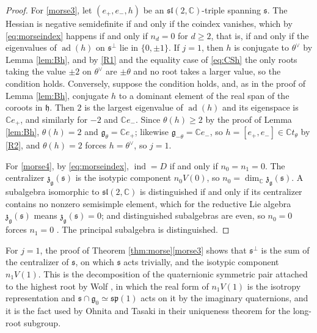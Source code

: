 \documentclass[leqno,10pt]{amsart}
\theoremstyle{definition}
\numberwithin{equation}{section}
\newcommand{\h}{\mathfrak{h}}
\newcommand{\sll}{\mathfrak{sl}}
\newcommand{\g}{\mathfrak{g}}
\newcommand{\ad}{\operatorname{ad}}
\newcommand{\com}{\mathbb C}
\newcommand{\gz}{\g_{0}}
\newcommand{\subs}{\mathfrak{s}}
\begin{document}
\begin{proof}
For \ref{morse3}, let $(e_{+}, e_{-}, h)$ be an $\sll(2, \com)$-triple spanning $\subs$. The Hessian is negative semidefinite if and only if the coindex vanishes, which by \eqref{eq:morseindex} happens if and only if $n_{d} = 0$ for $d \geq 2$, that is, if and only if the eigenvalues of $\ad(h)$ on $\subs^{\perp}$ lie in $\{0, \pm 1\}$. If $j = 1$, then $h$ is conjugate to $\theta^{\vee}$ by Lemma \ref{lem:Bh}, and by \ref{R1} and the equality case of \eqref{eq:CSh} the only roots taking the value $\pm 2$ on $\theta^{\vee}$ are $\pm\theta$ and no root takes a larger value, so the condition holds. Conversely, suppose the condition holds, and, as in the proof of Lemma \ref{lem:Bh}, conjugate $h$ to a dominant element of the real span of the coroots in $\h$. Then $2$ is the largest eigenvalue of $\ad(h)$ and its eigenspace is $\com e_{+}$, and similarly for $-2$ and $\com e_{-}$. Since $\theta(h) \geq 2$ by the proof of Lemma \ref{lem:Bh}, $\theta(h) = 2$ and $\g_{\theta} = \com e_{+}$; likewise $\g_{-\theta} = \com e_{-}$, so $h = [e_{+}, e_{-}] \in \com t_{\theta}$ by \ref{R2}, and $\theta(h) = 2$ forces $h = \theta^{\vee}$, so $j = 1$.

For \ref{morse4}, by \eqref{eq:morseindex}, $\operatorname{ind} = D$ if and only if $n_{0} = n_{1} = 0$. The centralizer $\mathfrak{z}_{\g}(\subs)$ is the isotypic component $n_{0}V(0)$, so $n_{0} = \dim_{\com}\mathfrak{z}_{\g}(\subs)$. A subalgebra isomorphic to $\sll(2, \com)$ is distinguished if and only if its centralizer contains no nonzero semisimple element, which for the reductive Lie algebra $\mathfrak{z}_{\g}(\subs)$ means $\mathfrak{z}_{\g}(\subs) = 0$; and distinguished subalgebras are even, so $n_{0} = 0$ forces $n_{1} = 0$ \cite[Section~8.2]{Collingwood-McGovern}. The principal subalgebra is distinguished.
\end{proof}

\begin{remark}\label{rem:wolf}
For $j = 1$, the proof of Theorem \ref{thm:morse}\ref{morse3} shows that $\subs^{\perp}$ is the sum of the centralizer of $\subs$, on which $\subs$ acts trivially, and the isotypic component $n_{1}V(1)$. This is the decomposition of the quaternionic symmetric pair attached to the highest root by Wolf \cite{Wolf-quaternionic}, in which the real form of $n_{1}V(1)$ is the isotropy representation and $\subs \cap \gz \simeq \mathfrak{sp}(1)$ acts on it by the imaginary quaternions, and it is the fact used by Ohnita and Tasaki \cite[(8)]{Ohnita-Tasaki} in their uniqueness theorem for the long-root subgroup.
\end{remark}
\end{document}
